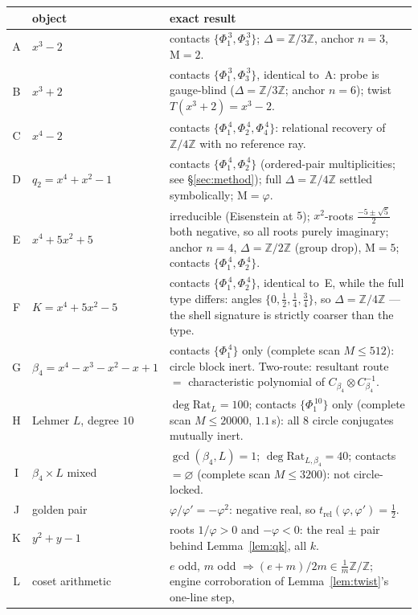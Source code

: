 \documentclass[11pt]{article}
\theoremstyle{plain}
\theoremstyle{definition}
\theoremstyle{remark}
\newcommand{\Z}{\mathbb{Z}}
\newcommand{\Mah}{\mathrm{M}}
\newcommand{\Rat}{\mathrm{Rat}}
\begin{document}
\begin{center}
\small
\begin{tabular}{clp{9.2cm}}
\hline
 & object & exact result\\
\hline
A & $x^3-2$ & contacts $\{\Phi_1^{\,3},\Phi_3^{\,3}\}$; $\Delta=\Z/3\Z$, anchor
$n=3$, $\Mah=2$.\\[2pt]
B & $x^3+2$ & contacts $\{\Phi_1^{\,3},\Phi_3^{\,3}\}$, identical to~A: probe is
gauge-blind ($\Delta=\Z/3\Z$; anchor $n=6$); twist $T(x^3+2)=x^3-2$.\\[2pt]
C & $x^4-2$ & contacts $\{\Phi_1^{\,4},\Phi_2^{\,4},\Phi_4^{\,4}\}$: relational
recovery of $\Z/4\Z$ with no reference ray.\\[2pt]
D & $q_2=x^4+x^2-1$ & contacts $\{\Phi_1^{\,4},\Phi_2^{\,4}\}$ (ordered-pair
multiplicities; see \S\ref{sec:method}); full $\Delta=\Z/4\Z$ settled
symbolically; $\Mah=\varphi$.\\[2pt]
E & $x^4+5x^2+5$ & irreducible (Eisenstein at $5$); $x^2$-roots
$\frac{-5\pm\sqrt5}{2}$ both negative, so all roots purely imaginary; anchor
$n=4$, $\Delta=\Z/2\Z$ (group drop), $\Mah=5$; contacts
$\{\Phi_1^{\,4},\Phi_2^{\,4}\}$.\\[2pt]
F & $K=x^4+5x^2-5$ & contacts $\{\Phi_1^{\,4},\Phi_2^{\,4}\}$, identical to~E,
while the full type differs: angles $\{0,\tfrac12,\tfrac14,\tfrac34\}$, so
$\Delta=\Z/4\Z$ --- the shell signature is strictly coarser than the type.\\[2pt]
G & $\beta_4=x^4-x^3-x^2-x+1$ & contacts $\{\Phi_1^{\,4}\}$ only (complete scan
$M\le512$): circle block inert. Two-route: resultant route $=$ characteristic
polynomial of $C_{\beta_4}\otimes C_{\beta_4}^{-1}$.\\[2pt]
H & Lehmer $L$, degree $10$ & $\deg\Rat_L=100$; contacts $\{\Phi_1^{\,10}\}$
only (complete scan $M\le20000$, $1.1$\,s): all $8$ circle conjugates mutually
inert.\\[2pt]
I & $\beta_4\times L$ mixed & $\gcd(\beta_4,L)=1$; $\deg\Rat_{L,\beta_4}=40$;
contacts $=\varnothing$ (complete scan $M\le3200$): not circle-locked.\\[2pt]
J & golden pair & $\varphi/\varphi'=-\varphi^2$: negative real, so
$t_{\mathrm{rel}}(\varphi,\varphi')=\tfrac12$.\\[2pt]
K & $y^2+y-1$ & roots $1/\varphi>0$ and $-\varphi<0$: the real $\pm$ pair
behind Lemma~\ref{lem:qk}, all $k$.\\[2pt]
L & coset arithmetic & $e$ odd, $m$ odd $\Rightarrow(e+m)/2m\in\frac1m\Z/\Z$;
engine corroboration of Lemma~\ref{lem:twist}'s one-line step,

\end{tabular}
\end{center}
\end{document}
